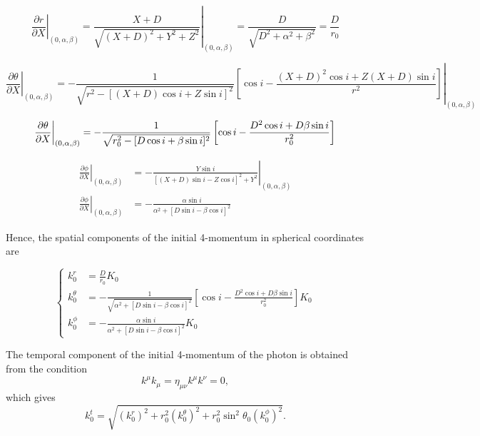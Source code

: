 \begin{equation}
\left. \frac{\partial r}{\partial X} \right|_{(0,\alpha,\beta)}= \left.\frac{X+D}{\sqrt{(X+D)^2 + Y^2 + Z^2}}\right|_{(0,\alpha,\beta)}
= \frac{D}{\sqrt{D^2 + \alpha^2 + \beta^2}} = \frac{D}{r_0}
\end{equation}

\footnotesize
\begin{equation}
\left. \frac{\partial \theta}{\partial X} \right|_{(0,\alpha,\beta)} = \left.-\frac{1}{\sqrt{r^2-[(X+D)\cos i + Z \sin i]^2}}  \left[ \cos i - \frac{(X+D)^2 \cos i + Z(X+D) \sin i}{r^2}\right]\right|_{(0,\alpha,\beta)} \nonumber
\end{equation}
\normalsize

\begin{equation}
\left. \frac{\partial \theta}{\partial X} \right|_{(0,\alpha,\beta)} = -\frac{1}{\sqrt{r^2_0 -[D\cos i + \beta \sin i]^2}}  \left[ \cos i - \frac{D^2 \cos i + D\beta \sin i}{r^2_0}\right]\\
\end{equation}

\begin{align}
\left. \frac{\partial \phi}{\partial X} \right|_{(0,\alpha,\beta)} &= \left.-\frac{Y \sin i}{[(X+D)\sin i - Z \cos i ]^2 + Y^2 } \right|_{(0,\alpha,\beta)} \nonumber \\
\left. \frac{\partial \phi}{\partial X} \right|_{(0,\alpha,\beta)} &= -\frac{\alpha \sin i}{\alpha^2 +[D \sin i - \beta \cos i]^2 }  
\end{align}

Hence, the spatial components of the initial 4-momentum in spherical coordinates are

\begin{equation}
\begin{cases}
k^r_0 &= \frac{D}{r_0} K_0\\
k^\theta _0 &= -\frac{1}{\sqrt{\alpha^2 +[D\sin i - \beta \cos i]^2}}  \left[ \cos i - \frac{D^2 \cos i + D\beta \sin i}{r^2_0}\right] K_0 \\
k^\phi _0 &= -\frac{\alpha \sin i}{\alpha^2 +[D \sin i - \beta \cos i]^2 } K_0
\end{cases} \label{initialSpatialMomentum}
\end{equation}

The temporal component of the initial 4-momentum of the photon is obtained from the condition 
\begin{equation}
k^\mu k_\mu =  \eta_{\mu \nu} k^\mu k^\nu = 0,
\end{equation}
which gives
\begin{equation}
k^t_0 = \sqrt{(k^r_0)^2 + r_0^2 (k^\theta _0)^2 + r_0^2 \sin^2 \theta_0 (k^\phi _0)^2}. \label{initialTempMomentum}
\end{equation}


